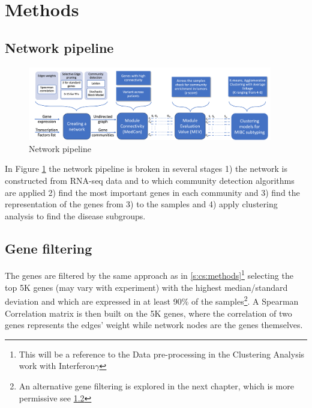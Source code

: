 \section{Methods} \label{s:N_I:methods}

\subsection{Network pipeline}


\begin{figure}[!htb]
    \centering\includegraphics[width=0.95\textwidth,height=0.95\textheight,keepaspectratio]{Sections/Network_I/Resources/Methods/network_pipeline.png}
    \caption{Network pipeline}
    \label{fig:N_I:network_pipeline}
\end{figure}


In Figure \ref{fig:N_I:network_pipeline} the network pipeline is broken in several stages 1) the network is constructed from RNA-seq data and to which community detection algorithms are applied 2) find the most important genes in each community and 3) find the representation of the genes from 3) to the samples and 4) apply clustering analysis to find the disease subgroups.


\subsection{Gene filtering}
The genes are filtered by the same approach as in \cref{s:cs:methods}\footnote{This will be a reference to the Data pre-processing in the Clustering Analysis work with Interferon$\gamma$} selecting the top 5K genes (may vary with experiment) with the highest median/standard deviation and which are expressed in at least 90\% of the samples\footnote{An alternative gene filtering is explored in the next chapter, which is more permissive see \ref{}}. A Spearman Correlation matrix is then built on the 5K genes, where the correlation of two genes represents the edges' weight while network nodes are the genes themselves. 

